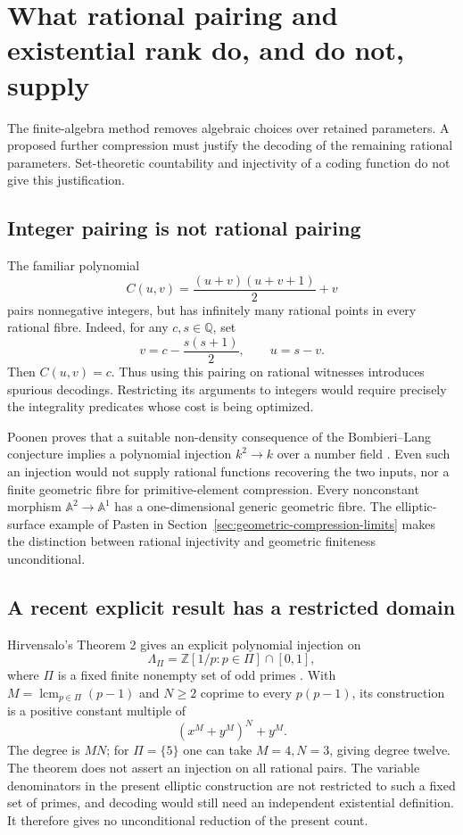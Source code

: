 \section{What rational pairing and existential rank do, and do not, supply}
\label{sec:packing-literature}

The finite-algebra method removes algebraic choices over retained
parameters.  A proposed further compression must justify the decoding
of the remaining rational parameters.  Set-theoretic countability and
injectivity of a coding function do not give this justification.

\subsection{Integer pairing is not rational pairing}

The familiar polynomial
\[
 C(u,v)=\frac{(u+v)(u+v+1)}2+v
\]
pairs nonnegative integers, but has infinitely many rational points
in every rational fibre.  Indeed, for any $c,s\in\mathbb Q$, set
\[
 v=c-\frac{s(s+1)}2,\qquad u=s-v.
\]
Then $C(u,v)=c$.  Thus using this pairing on rational witnesses
introduces spurious decodings.  Restricting its arguments to integers
would require precisely the integrality predicates whose cost is being
optimized.

Poonen proves that a suitable non-density consequence of the
Bombieri--Lang conjecture implies a polynomial injection
$k^2\to k$ over a number field
\cite[Theorem 1.1 and Remark 1.2]{P3Poonen2010}.  Even such an
injection would not supply rational functions recovering the two
inputs, nor a finite geometric fibre for primitive-element
compression.  Every nonconstant morphism
$\mathbb A^2\to\mathbb A^1$ has a one-dimensional generic
geometric fibre.  The elliptic-surface example of Pasten in
Section~\ref{sec:geometric-compression-limits} makes the distinction
between rational injectivity and geometric finiteness unconditional.

\subsection{A recent explicit result has a restricted domain}

Hirvensalo's Theorem 2 gives an explicit polynomial injection on
\[
 \Lambda_\Pi=\mathbb Z[1/p:p\in\Pi]\cap[0,1],
\]
where $\Pi$ is a fixed finite nonempty set of odd primes
\cite{P3Hirvensalo2026}.  With
$M=\operatorname{lcm}_{p\in\Pi}(p-1)$ and $N\ge2$ coprime to
every $p(p-1)$, its construction is a positive constant multiple of
\[
                       (x^M+y^M)^N+y^M.
\]
The degree is $MN$; for $\Pi=\{5\}$ one can take $M=4,N=3$,
giving degree twelve.  The theorem does not assert an injection
on all rational pairs.  The variable denominators in the present
elliptic construction are not restricted to such a fixed set of primes,
and decoding would still need an independent existential definition.
It therefore gives no unconditional reduction of the present count.

